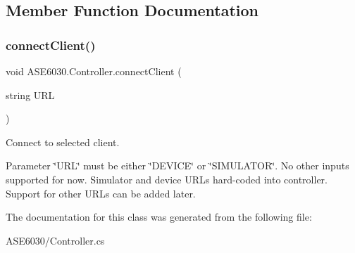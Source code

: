 \subsection{Member Function Documentation}
\mbox{\label{class_a_s_e6030_1_1_controller_a5f84e69b4885c561df4bc177fcc54d40}} 
\subsubsection{\texorpdfstring{connect\+Client()}{connectClient()}}
{\footnotesize\ttfamily void A\+S\+E6030.\+Controller.\+connect\+Client (\begin{DoxyParamCaption}\item[{string}]{U\+RL }\end{DoxyParamCaption})\hspace{0.3cm}{\ttfamily [inline]}}



Connect to selected client. 

Parameter \char`\"{}\+U\+R\+L\char`\"{} must be either \char`\"{}\+D\+E\+V\+I\+C\+E\char`\"{} or \char`\"{}\+S\+I\+M\+U\+L\+A\+T\+O\+R\char`\"{}. No other inputs supported for now. Simulator and device U\+R\+Ls hard-\/coded into controller. Support for other U\+R\+Ls can be added later. 

The documentation for this class was generated from the following file\+:\begin{DoxyCompactItemize}
\item 
A\+S\+E6030/Controller.\+cs\end{DoxyCompactItemize}
